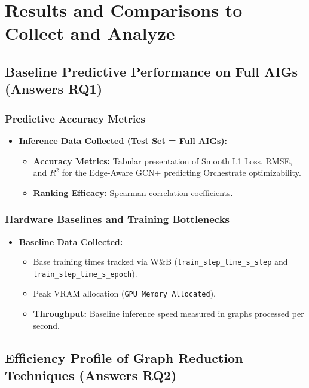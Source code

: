 \documentclass[paper=a4, fontsize=11pt]{scrartcl} %
\numberwithin{equation}{section} %
\numberwithin{figure}{section} %
\numberwithin{table}{section} %
\begin{document}
\section{Results and Comparisons to Collect and Analyze}

\subsection{Baseline Predictive Performance on Full AIGs (Answers RQ1)}

\subsubsection{Predictive Accuracy Metrics}
\begin{itemize}
    \item \textbf{Inference Data Collected (Test Set = Full AIGs):}
    \begin{itemize}
        \item \textbf{Accuracy Metrics:} Tabular presentation of Smooth L1 Loss, RMSE, and $R^2$ for the Edge-Aware GCN+ predicting Orchestrate optimizability.
        \item \textbf{Ranking Efficacy:} Spearman correlation coefficients.
    \end{itemize}
\end{itemize}

\subsubsection{Hardware Baselines and Training Bottlenecks}
\begin{itemize}
    \item \textbf{Baseline Data Collected:}
    \begin{itemize}
        \item Base training times tracked via W\&B (\texttt{train\_step\_time\_s\_step} and \texttt{train\_step\_time\_s\_epoch}).
        \item Peak VRAM allocation (\texttt{GPU Memory Allocated}).
        \item \textbf{Throughput:} Baseline inference speed measured in graphs processed per second.
    \end{itemize}
\end{itemize}



\subsection{Efficiency Profile of Graph Reduction Techniques (Answers RQ2)}
\end{document}
